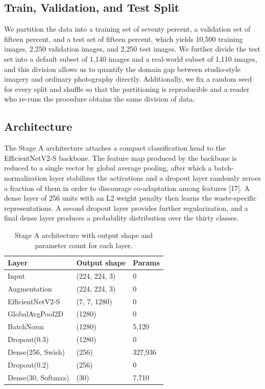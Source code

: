 \documentclass[10pt,twocolumn]{article}
\begin{document}
\subsection{Train, Validation, and Test Split}
We partition the data into a training set of seventy percent, a validation set of fifteen percent, and a test set of fifteen percent, which yields 10{,}500 training images, 2{,}250 validation images, and 2{,}250 test images. We further divide the test set into a default subset of 1{,}140 images and a real-world subset of 1{,}110 images, and this division allows us to quantify the domain gap between studio-style imagery and ordinary photography directly. Additionally, we fix a random seed for every split and shuffle so that the partitioning is reproducible and a reader who re-runs the procedure obtains the same division of data.

\subsection{Architecture}
The Stage A architecture attaches a compact classification head to the EfficientNetV2-S backbone. The feature map produced by the backbone is reduced to a single vector by global average pooling, after which a batch-normalization layer stabilizes the activations and a dropout layer randomly zeroes a fraction of them in order to discourage co-adaptation among features [17]. A dense layer of 256 units with an L2 weight penalty then learns the waste-specific representations. A second dropout layer provides further regularization, and a final dense layer produces a probability distribution over the thirty classes.

\begin{table}[t]
\centering
\footnotesize
\begin{tabular}{@{}lll@{}}
\toprule
\textbf{Layer} & \textbf{Output shape} & \textbf{Params} \\
\midrule
Input & (224, 224, 3) & 0 \\
Augmentation & (224, 224, 3) & 0 \\
EfficientNetV2-S & (7, 7, 1280) & 0 \\
GlobalAvgPool2D & (1280) & 0 \\
BatchNorm & (1280) & 5{,}120 \\
Dropout(0.3) & (1280) & 0 \\
Dense(256, Swish) & (256) & 327{,}936 \\
Dropout(0.2) & (256) & 0 \\
Dense(30, Softmax) & (30) & 7{,}710 \\
\bottomrule
\end{tabular}
\caption{Stage A architecture with output shape and parameter count for each layer.}
\label{tab:archA}
\end{table}
\end{document}
